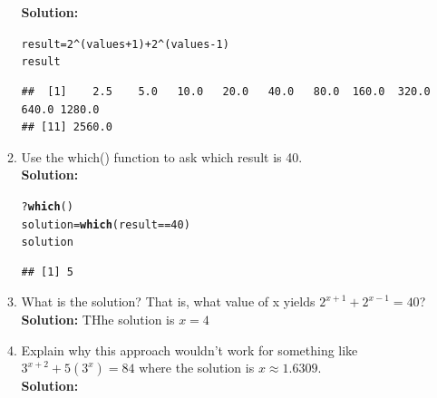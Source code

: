 \documentclass{article}\usepackage[]{graphicx}\usepackage[]{xcolor}
\makeatletter
\newcommand{\hlnum}[1]{\textcolor[rgb]{0.686,0.059,0.569}{#1}}%
\newcommand{\hlopt}[1]{\textcolor[rgb]{0,0,0}{#1}}%
\newcommand{\hldef}[1]{\textcolor[rgb]{0.345,0.345,0.345}{#1}}%
\newcommand{\hlkwb}[1]{\textcolor[rgb]{0.69,0.353,0.396}{#1}}%
\newcommand{\hlkwd}[1]{\textcolor[rgb]{0.737,0.353,0.396}{\textbf{#1}}}%
\newenvironment{kframe}{%
 \def\at@end@of@kframe{}%
 \ifinner\ifhmode%
  \def\at@end@of@kframe{\end{minipage}}%
  \begin{minipage}{\columnwidth}%
 \fi\fi%
 \def\FrameCommand##1{\hskip\@totalleftmargin \hskip-\fboxsep
 \colorbox{shadecolor}{##1}\hskip-\fboxsep
     \hskip-\linewidth \hskip-\@totalleftmargin \hskip\columnwidth}%
 \MakeFramed {\advance\hsize-\width
   \@totalleftmargin\z@ \linewidth\hsize
   \@setminipage}}%
 {\par\unskip\endMakeFramed%
 \at@end@of@kframe}
\newenvironment{knitrout}{}{} %
\makeatother
\begin{document}
\begin{enumerate}
\begin{enumerate}
\textbf{Solution:}
\begin{knitrout}\scriptsize
{}\color{fgcolor}\begin{kframe}
\begin{alltt}
\hldef{result} \hlkwb{=} \hlnum{2}\hlopt{^}\hldef{(values}\hlopt{+}\hlnum{1}\hldef{)} \hlopt{+} \hlnum{2}\hlopt{^}\hldef{(values}\hlopt{-}\hlnum{1}\hldef{)}
\hldef{result}
\end{alltt}
\begin{verbatim}
##  [1]    2.5    5.0   10.0   20.0   40.0   80.0  160.0  320.0  640.0 1280.0
## [11] 2560.0
\end{verbatim}
\end{kframe}
\end{knitrout}
  \item Use the which() function to ask which result is 40.\\
\textbf{Solution:}
\begin{knitrout}\scriptsize
{}\color{fgcolor}\begin{kframe}
\begin{alltt}
\hlopt{?}\hlkwd{which}\hldef{()}
\hldef{solution} \hlkwb{=} \hlkwd{which}\hldef{(result}\hlopt{==}\hlnum{40}\hldef{)}
\hldef{solution}
\end{alltt}
\begin{verbatim}
## [1] 5
\end{verbatim}
\end{kframe}
\end{knitrout}
  \item What is the solution? That is, what value of x yields $2^{x+1} +2^{x-1} = 40$?\\
\textbf{Solution:}
THhe solution is $x = 4$
  \item Explain why this approach wouldn't work for something like $3^{x+2} + 5 (3^x) = 84$ where the solution is $x \approx 1.6309$.\\
\textbf{Solution:}
\end{enumerate}
\end{enumerate}
\end{document}
